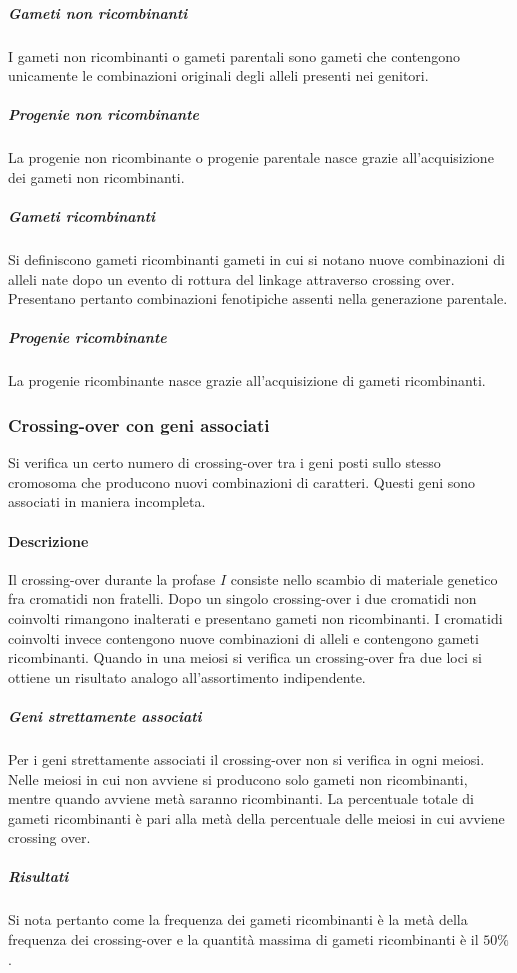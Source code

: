 				\subparagraph{Gameti non ricombinanti}
				I gameti non ricombinanti o gameti parentali sono gameti che contengono unicamente le combinazioni originali degli alleli presenti nei genitori.

				\subparagraph{Progenie non ricombinante}
				La progenie non ricombinante o progenie parentale nasce grazie all'acquisizione dei gameti non ricombinanti.

				\subparagraph{Gameti ricombinanti}
				Si definiscono gameti ricombinanti gameti in cui si notano nuove combinazioni di alleli nate dopo un evento di rottura del linkage attraverso crossing over.
				Presentano pertanto combinazioni fenotipiche assenti nella generazione parentale.
				
				\subparagraph{Progenie ricombinante}
				La progenie ricombinante nasce grazie all'acquisizione di gameti ricombinanti.

		\subsubsection{Crossing-over con geni associati}
		Si verifica un certo numero di crossing-over tra i geni posti sullo stesso cromosoma che producono nuovi combinazioni di caratteri.
		Questi geni sono associati in maniera incompleta.

			\paragraph{Descrizione}
			Il crossing-over durante la profase $I$ consiste nello scambio di materiale genetico fra cromatidi non fratelli.
			Dopo un singolo crossing-over i due cromatidi non coinvolti rimangono inalterati e presentano gameti non ricombinanti.
			I cromatidi coinvolti invece contengono nuove combinazioni di alleli e contengono gameti ricombinanti.
			Quando in una meiosi si verifica un crossing-over fra due loci si ottiene un risultato analogo all'assortimento indipendente.

				\subparagraph{Geni strettamente associati}
				Per i geni strettamente associati il crossing-over non si verifica in ogni meiosi.
				Nelle meiosi in cui non avviene si producono solo gameti non ricombinanti, mentre quando avviene met\`a saranno ricombinanti.
				La percentuale totale di gameti ricombinanti \`e pari alla met\`a della percentuale delle meiosi in cui avviene crossing over.

				\subparagraph{Risultati}
				Si nota pertanto come la frequenza dei gameti ricombinanti \`e la met\`a della frequenza dei crossing-over e la quantit\`a massima di gameti ricombinanti \`e il $50\%$.


